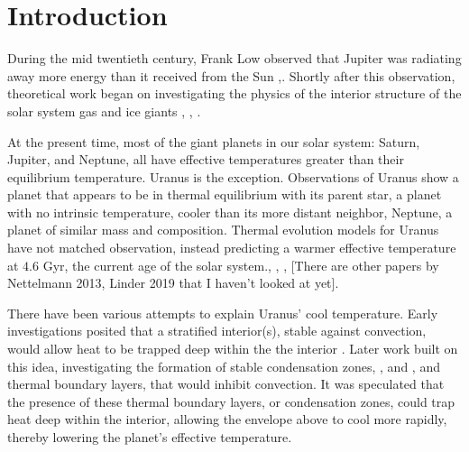 \documentclass[11pt]{ucscthesisbs}
\begin{document}
\chapter{Introduction}

During the mid twentieth century, Frank Low observed that Jupiter was radiating away more energy than it received from the Sun \citep{hubbard_1968},\citep{low_1966}. Shortly after this observation, theoretical work began on investigating the physics of the interior structure of the solar system gas and ice giants \citep{hubbard_1977}, \citep{hubbard_1977_2}, \citep{podolak_1991}. 


At the present time, most of the giant planets in our solar system: Saturn, Jupiter, and Neptune, all have effective temperatures greater than their equilibrium temperature. Uranus is the exception. Observations of Uranus show a planet that appears to be in thermal equilibrium with its parent star, a planet with no intrinsic temperature, cooler than its more distant neighbor, Neptune, a planet of similar mass and composition. Thermal evolution models for Uranus have not matched observation, instead predicting a warmer effective temperature at $4.6$ Gyr, the current age of the solar system.\citep{fortney_2011}, \citep{podolak_1991}, \citep{hubbard_1995}, \citep{scheibe_2019} [There are other papers by Nettelmann 2013, Linder 2019 that I haven't looked at yet]. 

There have been various attempts to explain Uranus' cool temperature. Early investigations posited that a stratified interior(s), stable against convection, would allow heat to be trapped deep within the the interior \citep{podolak_1991}. Later work built on this idea, investigating the formation of stable condensation zones\citep{friedson_2017}, \citep{leconte_2017}, and \citep{guillot_1995}, and thermal boundary layers\citep{nettelmann_2016}, that would inhibit convection. It was speculated that the presence of these thermal boundary layers, or condensation zones, could trap heat deep within the interior, allowing the envelope above to cool more rapidly, thereby lowering the planet's effective temperature.
\end{document}
